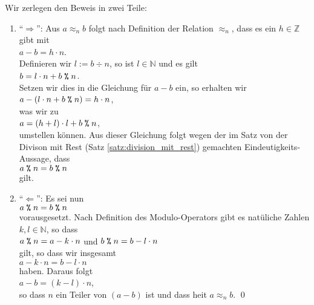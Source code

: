 \proof
Wir zerlegen den Beweis in zwei Teile:
\begin{enumerate}
\item ``$\Rightarrow$'':
      Aus $a \approx_n b$ folgt nach Definition der Relation $\approx_n$, dass es ein $h \in \mathbb{Z}$ gibt mit
      \\[0.2cm]
      \hspace*{1.3cm}
      $a - b = h \cdot n$.
      \\[0.2cm]
      Definieren wir $l := b \div n$, so ist $l \in \mathbb{N}$ und es gilt
      \\[0.2cm]
      \hspace*{1.3cm}
      $b = l \cdot n + b \;\texttt{\%}\; n$.
      \\[0.2cm]
      Setzen wir dies in die Gleichung f\"{u}r $a - b$ ein, so erhalten wir
      \\[0.2cm]
      \hspace*{1.3cm}
      $a - (l \cdot n + b \;\texttt{\%}\; n) = h \cdot n$,
      \\[0.2cm]
      was wir zu
      \\[0.2cm]
      \hspace*{1.3cm}
      $a = (h + l) \cdot l + b \;\texttt{\%}\; n$,
      \\[0.2cm]
      umstellen k\"{o}nnen.  Aus dieser Gleichung folgt wegen der im Satz von der Divison mit Rest 
      (Satz \ref{satz:division_mit_rest})
      gemachten Eindeutigkeits-Aussage, dass
      \\[0.2cm]
      \hspace*{1.3cm}
      $a \;\texttt{\%}\; n = b \;\texttt{\%}\; n$
      \\[0.2cm]
      gilt. \checkmark
\item ``$\Leftarrow$'':
      Es sei nun 
      \\[0.2cm]
      \hspace*{1.3cm}
      $a \;\texttt{\%}\; n = b \;\texttt{\%}\; n$ 
      \\[0.2cm]
      vorausgesetzt. Nach Definition des Modulo-Operators gibt es nat\"{u}liche Zahlen
      $k,l \in \mathbb{N}$, so dass 
      \\[0.2cm]
      \hspace*{1.3cm}
      $a \;\texttt{\%}\; n = a - k \cdot n$ \quad und \quad
      $b \;\texttt{\%}\; n = b - l \cdot n$ 
      \\[0.2cm]
      gilt, so dass wir insgesamt
      \\[0.2cm]
      \hspace*{1.3cm}
      $a - k \cdot n = b - l \cdot n$
      \\[0.2cm]
      haben.   Daraus folgt
      \\[0.2cm]
      \hspace*{1.3cm}
      $a - b = (k - l) \cdot n$,
      \\[0.2cm]
      so dass $n$ ein Teiler von $(a- b)$ ist und dass hei\3t $a \approx_n b$. \checkmark \qed
\end{enumerate}

